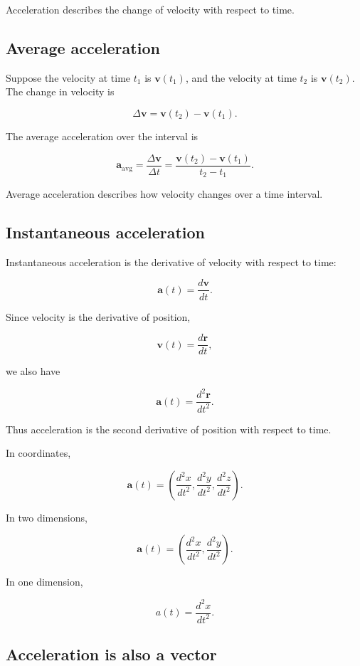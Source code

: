 Acceleration describes the change of velocity with respect to time.

\subsection{Average acceleration}

Suppose the velocity at time \(t_1\) is \(\mathbf{v}(t_1)\), and the velocity at time \(t_2\) is \(\mathbf{v}(t_2)\). The change in velocity is

\[
\Delta \mathbf{v}
=
\mathbf{v}(t_2)-\mathbf{v}(t_1).
\]

The average acceleration over the interval is

\[
\mathbf{a}_{\mathrm{avg}}
=
\frac{\Delta \mathbf{v}}{\Delta t}
=
\frac{\mathbf{v}(t_2)-\mathbf{v}(t_1)}{t_2-t_1}.
\]

Average acceleration describes how velocity changes over a time interval.

\subsection{Instantaneous acceleration}

Instantaneous acceleration is the derivative of velocity with respect to time:

\[
\mathbf{a}(t)
=
\frac{d\mathbf{v}}{dt}.
\]

Since velocity is the derivative of position,

\[
\mathbf{v}(t)=\frac{d\mathbf{r}}{dt},
\]

we also have

\[
\mathbf{a}(t)
=
\frac{d^2\mathbf{r}}{dt^2}.
\]

Thus acceleration is the second derivative of position with respect to time.

In coordinates,

\[
\mathbf{a}(t)
=
\left(
\frac{d^2x}{dt^2},
\frac{d^2y}{dt^2},
\frac{d^2z}{dt^2}
\right).
\]

In two dimensions,

\[
\mathbf{a}(t)
=
\left(
\frac{d^2x}{dt^2},
\frac{d^2y}{dt^2}
\right).
\]

In one dimension,

\[
a(t)=\frac{d^2x}{dt^2}.
\]

\subsection{Acceleration is also a vector}

